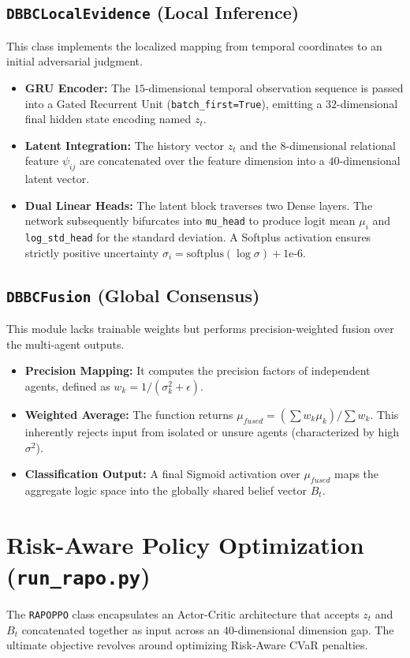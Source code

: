 \documentclass[11pt]{article}
\begin{document}
\subsection{\texttt{DBBCLocalEvidence} (Local Inference)}
This class implements the localized mapping from temporal coordinates to an initial adversarial judgment. 
\begin{itemize}
    \item \textbf{GRU Encoder:} The $15$-dimensional temporal observation sequence is passed into a Gated Recurrent Unit (\texttt{batch\_first=True}), emitting a $32$-dimensional final hidden state encoding named $z_t$.
    \item \textbf{Latent Integration:} The history vector $z_t$ and the $8$-dimensional relational feature $\psi_{ij}$ are concatenated over the feature dimension into a $40$-dimensional latent vector.
    \item \textbf{Dual Linear Heads:} The latent block traverses two Dense layers. The network subsequently bifurcates into \texttt{mu\_head} to produce logit mean $\mu_i$ and \texttt{log\_std\_head} for the standard deviation. A Softplus activation ensures strictly positive uncertainty $\sigma_i = \text{softplus}(\log{\sigma}) + 1\text{e-6}$.
\end{itemize}

\subsection{\texttt{DBBCFusion} (Global Consensus)}
This module lacks trainable weights but performs precision-weighted fusion over the multi-agent outputs.
\begin{itemize}
    \item \textbf{Precision Mapping:} It computes the precision factors of independent agents, defined as $w_k = 1 / (\sigma_k^2 + \epsilon)$.
    \item \textbf{Weighted Average:} The function returns $\mu_{fused} = (\sum w_k \mu_k) / \sum w_k$. This inherently rejects input from isolated or unsure agents (characterized by high $\sigma^2$).
    \item \textbf{Classification Output:} A final Sigmoid activation over $\mu_{fused}$ maps the aggregate logic space into the globally shared belief vector $B_t$.
\end{itemize}

\section{Risk-Aware Policy Optimization (\texttt{run\_rapo.py})}
The \texttt{RAPOPPO} class encapsulates an Actor-Critic architecture that accepts $z_t$ and $B_t$ concatenated together as input across an $40$-dimensional dimension gap. The ultimate objective revolves around optimizing Risk-Aware CVaR penalties.
\end{document}
